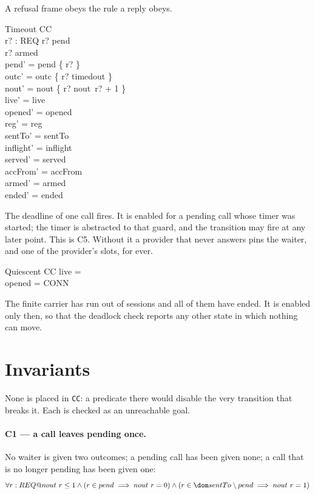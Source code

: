 \documentclass[a4paper,10pt,fleqn]{article}
\begin{document}
A refusal frame obeys the rule a reply obeys.

\begin{schema}{Timeout}
  \Delta CC \\
  r? : REQ
\where
  r? \in pend \\
  r? \in armed \\
  pend' = pend \setminus \{ r? \} \\
  outc' = outc \oplus \{ r? \mapsto timedout \} \\
  nout' = nout \oplus \{ r? \mapsto nout~r? + 1 \} \\
  live' = live \\
  opened' = opened \\
  reg' = reg \\
  sentTo' = sentTo \\
  inflight' = inflight \\
  served' = served \\
  accFrom' = accFrom \\
  armed' = armed \\
  ended' = ended
\end{schema}

The deadline of one call fires.  It is enabled for a pending call whose timer
was started; the timer is abstracted to that guard, and the transition may
fire at any later point.  This is C5.  Without it a provider that never
answers pins the waiter, and one of the provider's slots, for ever.

\begin{schema}{Quiescent}
  \Xi CC
\where
  live = \emptyset \\
  opened = CONN
\end{schema}

The finite carrier has run out of sessions and all of them have ended.  It
is enabled only then, so that the deadlock check reports any other state in
which nothing can move.

\section{Invariants}
\label{sec:inv}

None is placed in \texttt{CC}: a predicate there would disable the very
transition that breaks it.  Each is checked as an unreachable goal.

\paragraph{C1 --- a call leaves pending once.}
No waiter is given two outcomes; a pending call has been given none; a call
that is no longer pending has been given one:
\[
  \forall r : REQ @ nout~r \leq 1 \land (r \in pend \implies nout~r = 0)
    \land (r \in \dom sentTo \setminus pend \implies nout~r = 1)
\]
\end{document}
